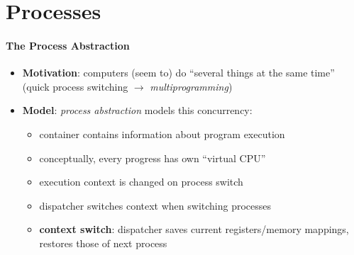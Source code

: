 \section{Processes}

\paragraph{The Process Abstraction}
\begin{itemize}
	\item \textbf{Motivation}: computers (seem to) do ``several things at the same time'' (quick process switching $ \to $ \emph{multiprogramming})
	\item \textbf{Model}: \emph{process abstraction} models this concurrency:
	\begin{itemize}
		\item container contains information about program execution
		\item conceptually, every progress has own "`virtual CPU"'
		\item execution context is changed on process switch
		\item dispatcher switches context when switching processes
		\item \textbf{context switch}: dispatcher saves current registers/memory mappings, restores those of next process
	\end{itemize}
\end{itemize}

